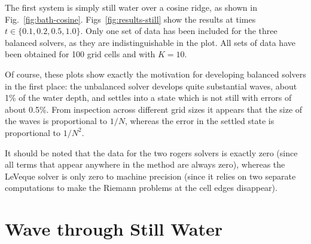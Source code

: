 The first system is simply still water over a cosine ridge, as shown in Fig.~\ref{fig:bath-cosine}. Figs~\ref{fig:results-still} show the results at times $t \in \{0.1, 0.2, 0.5, 1.0\}$. Only one set of data has been included for the three balanced solvers, as they are indistinguishable in the plot. All sets of data have been obtained for 100 grid cells and with $K = 10$.

Of course, these plots show exactly the motivation for developing balanced solvers in the first place: the unbalanced solver develops quite substantial waves, about 1\% of the water depth, and settles into a state which is not still with errors of about 0.5\%. From inspection across different grid sizes it appears that the size of the waves is proportional to $1/N$, whereas the error in the settled state is proportional to $1/N^2$.

It should be noted that the data for the two rogers solvers is exactly zero (since all terms that appear anywhere in the method are always zero), whereas the LeVeque solver is only zero to machine precision (since it relies on two separate computations to make the Riemann problems at the cell edges disappear).

\section{Wave through Still Water}

